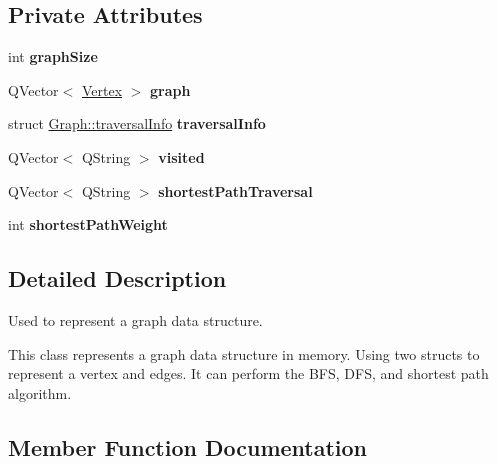 \subsection*{Private Attributes}
\begin{DoxyCompactItemize}
\item 
\mbox{\label{class_graph_afe71579cdcdc5c7b9645c76a6e45f06a}} 
int {\bfseries graph\+Size}
\item 
\mbox{\label{class_graph_aecb9b42f86fac7b1ee568e116d3dd7d5}} 
Q\+Vector$<$ \hyperlink{struct_vertex}{Vertex} $>$ {\bfseries graph}
\item 
\mbox{\label{class_graph_aa5e915f5ba679440537d34af1bd065ca}} 
struct \hyperlink{struct_graph_1_1traversal_info}{Graph\+::traversal\+Info} {\bfseries traversal\+Info}
\item 
\mbox{\label{class_graph_a01fe0226a8bdafa6eee4198aa6837c74}} 
Q\+Vector$<$ Q\+String $>$ {\bfseries visited}
\item 
\mbox{\label{class_graph_a7cb3226a43c4008c3420d9c07f7654f0}} 
Q\+Vector$<$ Q\+String $>$ {\bfseries shortest\+Path\+Traversal}
\item 
\mbox{\label{class_graph_afe57755d6ba7f57ea4aae950f5b90eef}} 
int {\bfseries shortest\+Path\+Weight}
\end{DoxyCompactItemize}


\subsection{Detailed Description}
Used to represent a graph data structure. 

This class represents a graph data structure in memory. Using two structs to represent a vertex and edges. It can perform the B\+FS, D\+FS, and shortest path algorithm. 

\subsection{Member Function Documentation}
\mbox{\label{class_graph_a11be2135c68163907d6bb1a268316876}} 
